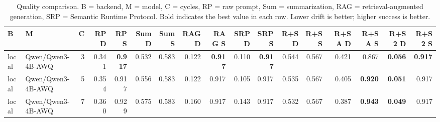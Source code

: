 \begin{table}[t]
\centering
\setlength{\tabcolsep}{3pt}
\scriptsize
\begin{tabular}{llrrrrrrrrrrrrrrr}
\toprule
B & M & C & RP D & RP S & Sum D & Sum S & RAG D & RAG S & SRP D & SRP S & R+S D & R+S S & R+SA D & R+SA S & R+S2 D & R+S2 S \\
\midrule
local & Qwen/Qwen3-4B-AWQ & 3 & 0.341 & \textbf{0.917} & 0.532 & 0.583 & 0.122 & \textbf{0.917} & 0.110 & \textbf{0.917} & 0.544 & 0.567 & 0.421 & 0.867 & \textbf{0.056} & \textbf{0.917} \\
local & Qwen/Qwen3-4B-AWQ & 5 & 0.354 & 0.917 & 0.556 & 0.583 & 0.122 & 0.917 & 0.105 & 0.917 & 0.535 & 0.567 & 0.405 & \textbf{0.920} & \textbf{0.051} & 0.917 \\
local & Qwen/Qwen3-4B-AWQ & 7 & 0.360 & 0.929 & 0.575 & 0.583 & 0.160 & 0.917 & 0.143 & 0.917 & 0.532 & 0.567 & 0.387 & \textbf{0.943} & \textbf{0.049} & 0.917 \\
\bottomrule
\end{tabular}
\caption{Quality comparison. B = backend, M = model, C = cycles, RP = raw prompt, Sum = summarization, RAG = retrieval-augmented generation, SRP = Semantic Runtime Protocol. Bold indicates the best value in each row. Lower drift is better; higher success is better.}
\label{tab:srp-quality-table}
\end{table}
